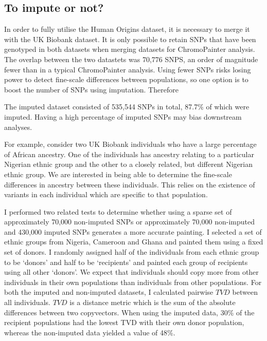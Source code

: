 

\subsection{To impute or not?}


In order to fully utilise the Human Origins dataset, it is necessary to merge it with the UK Biobank dataset. It is only possible to retain SNPs that have been genotyped in both datasets when merging datasets for ChromoPainter analysis. The overlap between the two datastets was 70,776 SNPS, an order of magnitude fewer than in a typical ChromoPainter analysis. Using fewer SNPs risks losing power to detect fine-scale differences between populations, so one option is to boost the number of SNPs using imputation. Therefore

The imputed dataset consisted of 535,544 SNPs in total, 87.7\% of which were imputed. Having a high percentage of imputed SNPs may bias downstream analyses. 

For example, consider two UK Biobank individuals who have a large percentage of African ancestry. One of the individuals has ancestry relating to a particular Nigerian ethnic group and the other to a closely related, but different Nigerian ethnic group. We are interested in being able to determine the fine-scale differences in ancestry between these individuals. This relies on the existence of variants in each individual which are specific to that population.

I performed two related tests to determine whether using a sparse set of approximately 70,000 non-imputed SNPs or approximately 70,000 non-imputed and 430,000 imputed SNPs generates a more accurate painting. I selected a set of ethnic groups from Nigeria, Cameroon and Ghana and painted them using a fixed set of donors. I randomly assigned half of the individuals from each ethnic group to be `donors' and half to be `recipients' and painted each group of recipients using all other `donors'. We expect that individuals should copy more from other individuals in their own populations than individuals from other populations. For both the imputed and non-imputed datasets, I calculated pairwise $TVD$ between all individuals. $TVD$ is a distance metric which is the sum of the absolute differences between two copyvectors. When using the imputed data, 30\% of the recipient populations had the lowest TVD with their own donor population, whereas the non-imputed data yielded a value of 48\%. 

